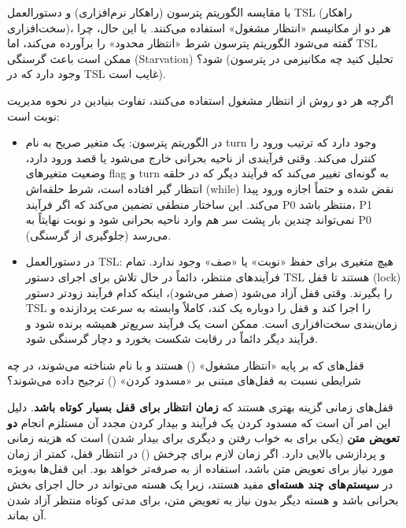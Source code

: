 \documentclass[12pt, answers]{exam}
\begin{document}
\begin{questions}
    \pagebreak
    \question با مقایسه الگوریتم پترسون (راهکار نرم‌افزاری) و دستورالعمل TSL (راهکار سخت‌افزاری)، هر دو از مکانیسم «انتظار مشغول»  استفاده می‌کنند. با این حال، چرا گفته می‌شود الگوریتم پترسون شرط «انتظار محدود» را برآورده می‌کند، اما TSL ممکن است باعث گرسنگی (Starvation) شود؟ (تحلیل کنید چه مکانیزمی در پترسون وجود دارد که در TSL غایب است).
    \begin{solution}
        اگرچه هر دو روش از انتظار مشغول  استفاده می‌کنند، تفاوت بنیادین در نحوه مدیریت نوبت است:

        \begin{itemize}
            \item در الگوریتم پترسون:
                  یک متغیر صریح به نام
                  turn وجود دارد که ترتیب ورود را کنترل می‌کند. وقتی فرآیندی از ناحیه بحرانی خارج می‌شود یا قصد ورود دارد، وضعیت متغیرهای flag و turn به گونه‌ای تغییر می‌کند که فرآیند دیگر که در حلقه انتظار گیر افتاده است، شرط حلقه‌اش (while) نقض شده و حتماً اجازه ورود پیدا می‌کند. این ساختار منطقی تضمین می‌کند که اگر فرآیند P0 منتظر باشد، P1 نمی‌تواند چندین بار پشت سر هم وارد ناحیه بحرانی شود و نوبت نهایتاً به P0 می‌رسد (جلوگیری از گرسنگی).

            \item در دستورالعمل TSL: هیچ متغیری برای حفظ «نوبت» یا «صف» وجود ندارد. تمام فرآیندهای منتظر، دائماً در حال تلاش برای اجرای دستور TSL هستند تا قفل (lock) را بگیرند. وقتی قفل آزاد می‌شود (صفر می‌شود)، اینکه کدام فرآیند زودتر دستور TSL را اجرا کند و قفل را دوباره یک کند، کاملاً وابسته به سرعت پردازنده و زمان‌بندی سخت‌افزاری است. ممکن است یک فرآیند سریع‌تر همیشه برنده شود و فرآیند دیگر دائماً در رقابت شکست بخورد و دچار گرسنگی شود.
        \end{itemize}
    \end{solution}

    \pagebreak
    \question
    قفل‌های  که بر پایه «انتظار مشغول» () هستند و
    با نام  شناخته می‌شوند،
    در چه شرایطی نسبت به قفل‌های مبتنی بر «مسدود کردن» () ترجیح داده می‌شوند؟
    \\
    \begin{solution}

        قفل‌های  زمانی گزینه بهتری هستند که \textbf{زمان انتظار برای قفل بسیار کوتاه باشد}. دلیل این امر آن است که مسدود کردن یک فرآیند و بیدار کردن مجدد آن مستلزم انجام \textbf{دو تعویض متن} (یکی برای به خواب رفتن و دیگری برای بیدار شدن) است که هزینه زمانی و پردازشی بالایی دارد. اگر زمان لازم برای چرخش () در انتظار قفل، کمتر از زمان مورد نیاز برای تعویض متن باشد، استفاده از  به صرفه‌تر خواهد بود. این قفل‌ها به‌ویژه در \textbf{سیستم‌های چند هسته‌ای} مفید هستند، زیرا یک هسته می‌تواند در حال اجرای بخش بحرانی باشد و هسته دیگر بدون نیاز به تعویض متن، برای مدتی کوتاه منتظر آزاد شدن آن بماند.
    \end{solution}


\end{questions}
\end{document}
